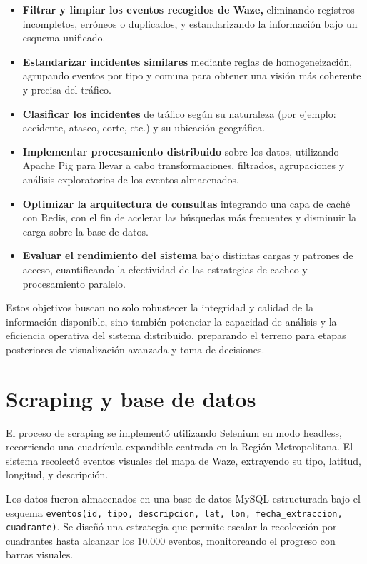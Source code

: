 \documentclass[12pt]{article}
\begin{document}
\begin{itemize}
    \item \textbf{Filtrar y limpiar los eventos recogidos de Waze,} eliminando registros incompletos, erróneos o duplicados, y estandarizando la información bajo un esquema unificado.
    \item \textbf{Estandarizar incidentes similares} mediante reglas de homogeneización, agrupando eventos por tipo y comuna para obtener una visión más coherente y precisa del tráfico.
    \item \textbf{Clasificar los incidentes} de tráfico según su naturaleza (por ejemplo: accidente, atasco, corte, etc.) y su ubicación geográfica.
    \item \textbf{Implementar procesamiento distribuido} sobre los datos, utilizando Apache Pig para llevar a cabo transformaciones, filtrados, agrupaciones y análisis exploratorios de los eventos almacenados.
    \item \textbf{Optimizar la arquitectura de consultas} integrando una capa de caché con Redis, con el fin de acelerar las búsquedas más frecuentes y disminuir la carga sobre la base de datos.
    \item \textbf{Evaluar el rendimiento del sistema} bajo distintas cargas y patrones de acceso, cuantificando la efectividad de las estrategias de cacheo y procesamiento paralelo.
\end{itemize}

Estos objetivos buscan no solo robustecer la integridad y calidad de la información disponible, sino también potenciar la capacidad de análisis y la eficiencia operativa del sistema distribuido, preparando el terreno para etapas posteriores de visualización avanzada y toma de decisiones.


\section{Scraping y base de datos}

El proceso de scraping se implementó utilizando Selenium en modo headless, recorriendo una cuadrícula expandible centrada en la Región Metropolitana. El sistema recolectó eventos visuales del mapa de Waze, extrayendo su tipo, latitud, longitud, y descripción.

Los datos fueron almacenados en una base de datos MySQL estructurada bajo el esquema \texttt{eventos(id, tipo, descripcion, lat, lon, fecha\_extraccion, cuadrante)}. Se diseñó una estrategia que permite escalar la recolección por cuadrantes hasta alcanzar los 10.000 eventos, monitoreando el progreso con barras visuales.
\end{document}
